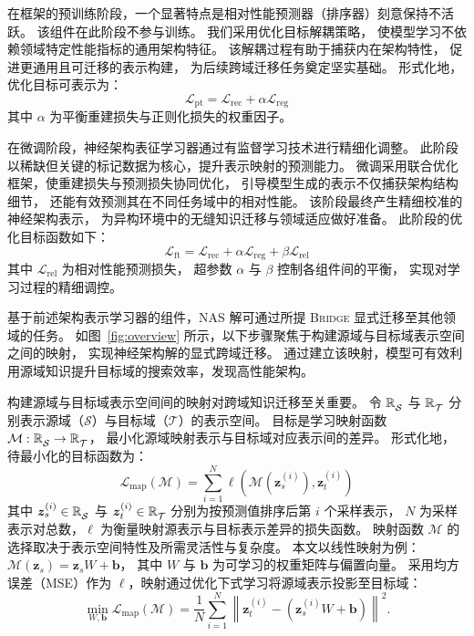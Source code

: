 \documentclass[../main.tex]{subfiles}
\begin{document}
在框架的预训练阶段，一个显著特点是相对性能预测器（排序器）刻意保持不活跃。
该组件在此阶段不参与训练。
我们采用优化目标解耦策略，
使模型学习不依赖领域特定性能指标的通用架构特征。
该解耦过程有助于捕获内在架构特性，
促进更通用且可迁移的表示构建，
为后续跨域迁移任务奠定坚实基础。
形式化地，优化目标可表示为：
\begin{equation}
	\mathcal{L}_\mathrm{pt} = \mathcal{L}_\mathrm{rec} + \alpha\mathcal{L}_\mathrm{reg}
\end{equation}
其中 $ \alpha $ 为平衡重建损失与正则化损失的权重因子。


在微调阶段，神经架构表征学习器通过有监督学习技术进行精细化调整。
此阶段以稀缺但关键的标记数据为核心，提升表示映射的预测能力。
微调采用联合优化框架，使重建损失与预测损失协同优化，
引导模型生成的表示不仅捕获架构结构细节，
还能有效预测其在不同任务域中的相对性能。
该阶段最终产生精细校准的神经架构表示，
为异构环境中的无缝知识迁移与领域适应做好准备。
此阶段的优化目标函数如下：
\begin{equation}
	\mathcal{L}_\mathrm{ft} = \mathcal{L}_\mathrm{rec} + \alpha\mathcal{L}_\mathrm{reg} + \beta\mathcal{L}_\mathrm{rel}
\end{equation}
其中 $ \mathcal{L}_\mathrm{rel} $ 为相对性能预测损失，
超参数 $ \alpha $ 与 $ \beta $ 控制各组件间的平衡，
实现对学习过程的精细调控。


基于前述架构表示学习器的组件，NAS 解可通过所提 \textsc{Bridge} 显式迁移至其他领域的任务。
如图~\ref{fig:overview} 所示，以下步骤聚焦于构建源域与目标域表示空间之间的映射，
实现神经架构解的显式跨域迁移。
通过建立该映射，模型可有效利用源域知识提升目标域的搜索效率，发现高性能架构。

构建源域与目标域表示空间间的映射对跨域知识迁移至关重要。
令 $ \mathbb{R}^{\mathstrut}_{\mathcal{S}} $ 与 $ \mathbb{R}^{\mathstrut}_{\mathcal{T}} $ 分别表示源域（$ \mathcal{S} $）与目标域（$ \mathcal{T} $）的表示空间。
目标是学习映射函数 $ \mathcal{M}: \mathbb{R}^{\mathstrut}_{\mathcal{S}} \rightarrow \mathbb{R}^{\mathstrut}_\mathcal{T} $，
最小化源域映射表示与目标域对应表示间的差异。
形式化地，待最小化的目标函数为：
\begin{equation}
	\mathcal{L}_\mathrm{map}(\mathcal{M}) = \sum_{i=1}^{N}{\ell\left(\mathcal{M}(\bm{z}_{s}^{(i)}),\bm{z}_{t}^{(i)}\right)}
\end{equation}
其中 $ \bm{z}^{(i)}_{s} \in \mathbb{R}^{\mathstrut}_{\mathcal{S}} $ 与 $ \bm{z}^{(i)}_{t} \in \mathbb{R}^{\mathstrut}_{\mathcal{T}} $ 分别为按预测值排序后第 $ i $ 个采样表示，
$ N $ 为采样表示对总数，$ \ell $ 为衡量映射源表示与目标表示差异的损失函数。
映射函数 $ \mathcal{M} $ 的选择取决于表示空间特性及所需灵活性与复杂度。
本文以线性映射为例：$ \mathcal{M}(\bm{z}_{s}) = \bm{z}_{s}W + \bm{b} $，
其中 $ W $ 与 $ \bm{b} $ 为可学习的权重矩阵与偏置向量。
采用均方误差（MSE）作为 $ \ell $，映射通过优化下式学习将源域表示投影至目标域：
\begin{equation}
	\min_{W,\mathbf{b}} \mathcal{L}_\mathrm{map}(\mathcal{M}) = \frac{1}{N}\sum_{i=1}^{N}{\left\|\bm{z}_{t}^{(i)} - \left(\bm{z}_{s}^{(i)}W + \bm{b}\right)\right\|}^{2}.
\end{equation}
\end{document}
